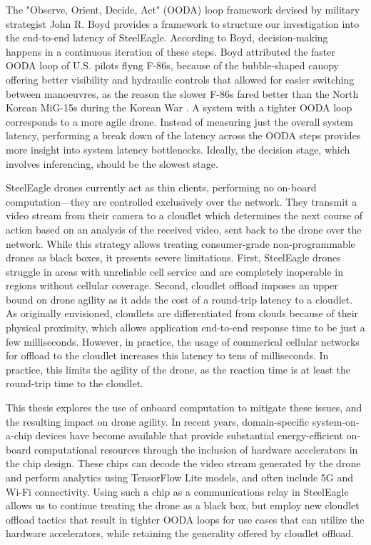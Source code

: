 The "Observe, Orient, Decide, Act" (OODA) loop framework devised by military
strategist John R. Boyd provides a framework to structure our investigation
into the end-to-end latency of SteelEagle. According to Boyd, decision-making
happens in a continuous iteration of these steps. Boyd attributed the faster
OODA loop of U.S. pilots flyng F-86s, because of the bubble-shaped canopy
offering better visibility and hydraulic controls that allowed for easier
switching between manoeuvres, as the reason the slower F-86s fared better than
the North Korean MiG-15s during the Korean War \cite{morton1995}. A system with
a tighter OODA loop corresponds to a more agile drone. Instead of measuring
just the overall system latency, performing a break down of the latency across
the OODA steps provides more insight into system latency bottlenecks. Ideally,
the decision stage, which involves inferencing, should be the slowest stage.

SteelEagle drones currently act as thin clients, performing no on-board
computation---they are controlled exclusively over the network. They transmit a
video stream from their camera to a cloudlet which determines the next course
of action based on an analysis of the received video, sent back to the drone
over the network. While this strategy allows treating consumer-grade
non-programmable drones as black boxes, it presents severe limitations. First,
SteelEagle drones struggle in areas with unreliable cell service and are
completely inoperable in regions without cellular coverage. Second, cloudlet
offload imposes an upper bound on drone agility as it adds the cost of a
round-trip latency to a cloudlet. As originally envisioned, cloudlets are
differentiated from clouds because of their physical proximity, which allows
application end-to-end response time to be just a few milliseconds. However, in
practice, the usage of commerical cellular networks for offload to the cloudlet
increases this latency to tens of milliseconds. In practice, this limits the
agility of the drone, as the reaction time is at least the round-trip time to
the cloudlet.

This thesis explores the use of onboard computation to mitigate these issues,
and the resulting impact on drone agility. In recent years, domain-specific
system-on-a-chip devices have become available that provide substantial
energy-efficient on-board computational resources through the inclusion of
hardware accelerators in the chip design. These chips can decode the video
stream generated by the drone and perform analytics using TensorFlow Lite
models, and often include 5G and Wi-Fi connectivity. Using such a chip as a
communications relay in SteelEagle allows us to continue treating the drone as
a black box, but employ new cloudlet offload tactics that result in tighter
OODA loops for use cases that can utilize the hardware accelerators, while
retaining the generality offered by cloudlet offload.

